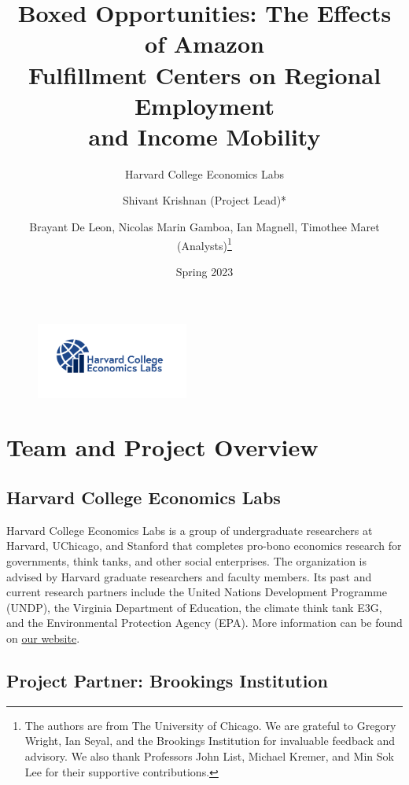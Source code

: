 \documentclass[11pt]{article}
\begin{document}
\title{\textbf{Boxed Opportunities: The Effects of Amazon \\ Fulfillment Centers on Regional Employment \\ and Income Mobility }}
\author{Harvard College  Economics Labs \and Shivant Krishnan (Project Lead)* \and Brayant De Leon, Nicolas Marin Gamboa, Ian Magnell,  Timothee Maret (Analysts)\footnote{The authors are from The University of Chicago. We are grateful to Gregory Wright, Ian Seyal, and the Brookings Institution for invaluable feedback and advisory. We also thank Professors John List, Michael Kremer, and Min Sok Lee for their supportive contributions.}}
\date{Spring 2023}
\begin{figure}[t]
\centering
\includegraphics[width=5cm]{Eclabs_logo.png}
\end{figure}

\maketitle
\newpage
\tableofcontents
\newpage

\section{Team and Project Overview}
\subsection{Harvard College Economics Labs}

\-\hspace{0.5cm} Harvard College Economics Labs is a group of undergraduate researchers at Harvard, UChicago, and Stanford that completes pro-bono economics research for governments, think tanks, and other social enterprises. The organization is advised by Harvard graduate researchers and faculty members. Its past and current research partners include the United Nations Development Programme (UNDP), the Virginia Department of Education, the climate think tank E3G, and the Environmental Protection Agency (EPA). More information can be found on \hyperlink{www.harvardeconomics.org}{our website}.

\subsection{Project Partner: Brookings Institution}
\end{document}
